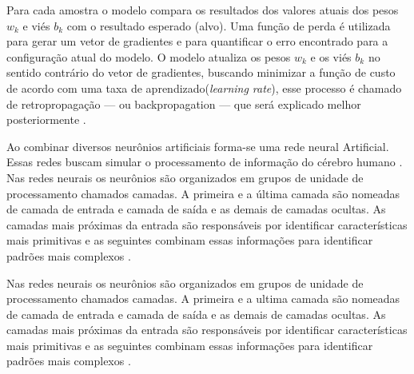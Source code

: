 Para cada amostra o modelo compara os resultados dos valores atuais dos pesos $w_k$ e viés $b_k$ com o resultado esperado (alvo). Uma função de perda é utilizada para gerar um vetor de gradientes e para quantificar o erro encontrado para a configuração atual do modelo. O modelo atualiza os pesos $w_k$ e os viés $b_k$ no sentido contrário do vetor de gradientes, buscando minimizar a função de custo de acordo com uma taxa de aprendizado(\textit{learning rate}), esse processo é chamado de retropropagação — ou backpropagation — que será explicado melhor posteriormente \cite{marti2017aprendizado}.

Ao combinar diversos neurônios artificiais forma-se uma rede neural Artificial. Essas redes buscam simular o processamento de informação do cérebro humano \cite{ferneda2006redes}.
Nas redes neurais os neurônios são organizados em grupos de unidade de processamento chamados camadas. A primeira e a última camada são nomeadas de camada de entrada e camada de saída e as demais de camadas ocultas. As camadas mais próximas da entrada são responsáveis por identificar características mais primitivas e as seguintes combinam essas informações para identificar padrões mais complexos \cite{marti2017aprendizado}.

Nas redes neurais os neurônios são organizados em grupos de unidade de processamento chamados camadas. A primeira e a ultima camada são nomeadas de camada de entrada e camada de saída e as demais de camadas ocultas. As camadas mais próximas da entrada são responsáveis por identificar características mais primitivas e as seguintes combinam essas informações para identificar padrões mais complexos \cite{marti2017aprendizado}.

